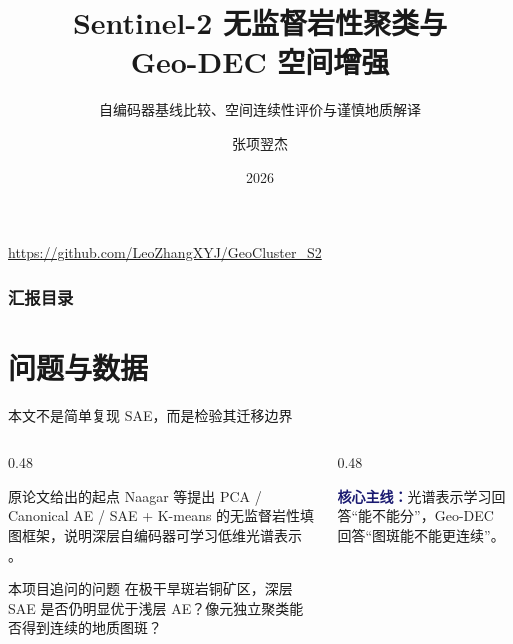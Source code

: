 \documentclass[10pt,aspectratio=169]{beamer}
\title[Sentinel-2 岩性聚类]{Sentinel-2 无监督岩性聚类与\\Geo-DEC 空间增强}
\subtitle{自编码器基线比较、空间连续性评价与谨慎地质解译}
\author[张项翌杰]{张项翌杰}
\institute[ZJU]{浙江大学}
\date{2026}
\newcommand{\claim}[1]{\textcolor{MidnightBlue}{\textbf{#1}}}
\begin{document}
\begin{frame}
  \titlepage
  \vspace{0.5em}
  \begin{center}
    \small
    \textcolor{gray}{\url{https://github.com/LeoZhangXYJ/GeoCluster_S2}}
  \end{center}
\end{frame}

\begin{frame}
  \frametitle{汇报目录}
  \tableofcontents
\end{frame}

\section{问题与数据}

\begin{frame}{本文不是简单复现 SAE，而是检验其迁移边界}
  \begin{columns}[T,onlytextwidth]
    \begin{column}{0.48\linewidth}
      \begin{block}{原论文给出的起点}
        \small
        Naagar 等提出 PCA / Canonical AE / SAE + K-means 的无监督岩性填图框架，说明深层自编码器可学习低维光谱表示 \cite{naagar2024remote}。
      \end{block}
      \begin{block}{本项目追问的问题}
        \small
        在极干旱斑岩铜矿区，深层 SAE 是否仍明显优于浅层 AE？像元独立聚类能否得到连续的地质图斑？
      \end{block}
    \end{column}
    \begin{column}{0.48\linewidth}
      \small
      \begin{table}
        \centering
      \end{table}
      \vspace{0.25em}
      \claim{核心主线：}光谱表示学习回答“能不能分”，Geo-DEC 回答“图斑能不能更连续”。
    \end{column}
  \end{columns}
\end{frame}
\end{document}
